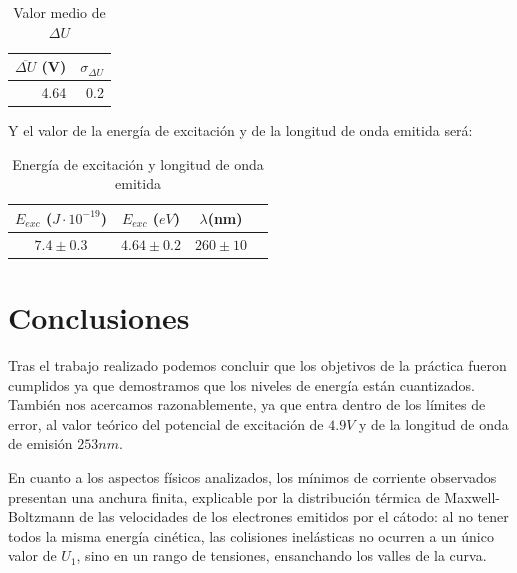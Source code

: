 \documentclass[11pt, a4paper, twocolumn]{article}
\begin{document}
\begin{table}[h]
\centering   

\begin{tabular}{rr}

   $\overline{\Delta U}$ (V)&   $\sigma_{\Delta U}$ \\
\hline
             4.64 &                 0.2\\
\hline
\end{tabular}
\label{tab: TablaAD}
\caption{Valor medio de $\Delta U$ }
\end{table}

\newpage

Y el valor de la energía de excitación y de la longitud de onda emitida será:

\begin{table}[h]
\begin{tabular}{cccc}

   $E_{exc}$ ($J\cdot 10^{-19}$) & $E_{exc}$ ($eV$) & $\lambda$(nm)\\
\hline
   $7.4 \pm 0.3 $     & $4.64\pm0.2$&$260\pm10$\\
                        
\hline
\end{tabular}
\label{tab: TABLAFINNNN}
\caption{Energía de excitación y longitud de onda emitida}
\end{table}


\section{Conclusiones}

Tras el trabajo realizado podemos concluir que los objetivos de la práctica fueron 
cumplidos ya que demostramos que los niveles de energía están cuantizados. También
 nos acercamos razonablemente, ya que entra dentro de los límites de error, al valor 
 teórico del potencial de excitación de $4.9V$ y de la longitud de onda 
de emisión $253 nm$. 

\vspace{0.2cm}

En cuanto a los aspectos físicos analizados, los mínimos de corriente 
observados presentan una anchura finita, explicable por la distribución 
térmica de Maxwell-Boltzmann de las velocidades de los electrones emitidos 
por el cátodo: al no tener todos la misma energía cinética, las colisiones 
inelásticas no ocurren a un único valor de $U_1$, sino en un rango de 
tensiones, ensanchando los valles de la curva.
\end{document}
